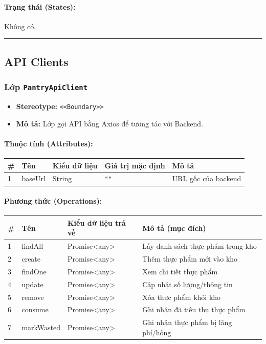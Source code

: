 \documentclass[12pt,a4paper]{article}
\begin{document}
\paragraph{Trạng thái (States):}
Không có.

\vskip 0.5cm
\noindent\rule{\textwidth}{0.5pt}
\vskip 0.5cm

\subsection{API Clients}

\subsubsection{Lớp \texttt{PantryApiClient}}
\begin{itemize}[leftmargin=*]
    \item \textbf{Stereotype:} \texttt{\textless{}\textless{}Boundary\textgreater{}\textgreater{}}
    \item \textbf{Mô tả:} Lớp gọi API bằng Axios để tương tác với Backend.
\end{itemize}

\paragraph{Thuộc tính (Attributes):}
\begin{longtable}{|p{0.6cm}|p{2.8cm}|p{2.2cm}|p{1.8cm}|p{5.8cm}|}
\hline
\textbf{\#} & \textbf{Tên} & \textbf{Kiểu dữ liệu} & \textbf{Giá trị mặc định} & \textbf{Mô tả} \\ \hline
\endhead
1 & baseUrl & String & \texttt{""} & URL gốc của backend \\ \hline
\end{longtable}

\paragraph{Phương thức (Operations):}
\begin{longtable}{|p{0.6cm}|p{3.8cm}|p{2.6cm}|p{6.5cm}|}
\hline
\textbf{\#} & \textbf{Tên} & \textbf{Kiểu dữ liệu trả về} & \textbf{Mô tả (mục đích)} \\ \hline
\endhead
1 & findAll & Promise\textless{}any\textgreater{} & Lấy danh sách thực phẩm trong kho \\ \hline
2 & create & Promise\textless{}any\textgreater{} & Thêm thực phẩm mới vào kho \\ \hline
3 & findOne & Promise\textless{}any\textgreater{} & Xem chi tiết thực phẩm \\ \hline
4 & update & Promise\textless{}any\textgreater{} & Cập nhật số lượng/thông tin \\ \hline
5 & remove & Promise\textless{}any\textgreater{} & Xóa thực phẩm khỏi kho \\ \hline
6 & consume & Promise\textless{}any\textgreater{} & Ghi nhận đã tiêu thụ thực phẩm \\ \hline
7 & markWasted & Promise\textless{}any\textgreater{} & Ghi nhận thực phẩm bị lãng phí/hỏng \\ \hline
\end{longtable}
\end{document}
